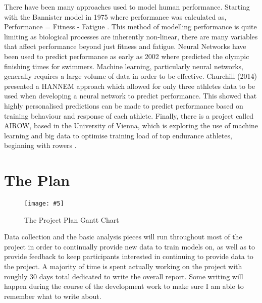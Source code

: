 \documentclass[a4paper]{article}
\newcommand{\includescalefigure}[5]{
\begin{figure}[!ht]
\centering
\texttt{[image: \#5]}
\captionsetup{width=.8\linewidth} 
\caption[#2]{#3}
\label{#1}
\end{figure}
}
\begin{document}
There have been many approaches used to model human performance. Starting with the Bannister model in 1975 where performance was calculated as, Performance = Fitness - Fatigue \autocite{Bannister1976}. This method of modelling performance is quite limiting as biological processes are inherently non-linear, there are many variables that affect performance beyond just fitness and fatigue. Neural Networks have been used to predict performance as early as 2002 where \textcite{Edelmannnusser2002} predicted the olympic finishing times for swimmers. Machine learning, particularly neural networks, generally requires a large volume of data in order to be effective. Churchill (2014) \autocite{Churchill2014} presented a HANNEM approach which allowed for only three athletes data to be used when developing a neural network to predict performance. This showed that highly personalised predictions can be made to predict performance based on training behaviour and response of each athlete. Finally, there is a project called AIROW, based in the University of Vienna, which is exploring the use of machine learning and big data to optimise training load of top endurance athletes, beginning with rowers \autocite{AIROW}.

\section{The Plan}
{
\includescalefigure{fig:the_plan}{The Plan}{The Project Plan Gantt Chart}{0.9}{project_plan.png}
}
Data collection and the basic analysis pieces will run throughout most of the project in order to continually provide new data to train models on, as well as to provide feedback to keep participants interested in continuing to provide data to the project. A majority of time is spent actually working on the project with roughly 30 days total dedicated to write the overall report. Some writing will happen during the course of the development work to make sure I am able to remember what to write about.
\end{document}
